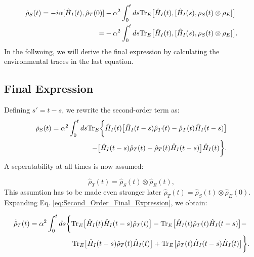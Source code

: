 \begin{align}
	\dot{\rho}_S(t) = -i \alpha [\hat{H}_I(t),\hat{\rho}_T(0)]
	  & - \alpha^2 \int_0^t ds \mathrm{Tr}_E \big[\hat{H}_I(t), [\hat{H}_I(s), \rho_S(t) \otimes \rho_E]\big] \notag \\
	= & - \alpha^2 \int_0^t ds \mathrm{Tr}_E \big[\hat{H}_I(t), [\hat{H}_I(s), \rho_S(t) \otimes \rho_E]\big].
	\label{eq:Partial_Trace_Derivation}
\end{align}
In the follwoing, we will derive the final expression by calculating the environmental traces in the last equation.


\subsection{Final Expression}
\label{subsec:Final_Expression}

Defining $s' = t - s$, we rewrite the second-order term as:
\begin{align}
	\dot{\rho}_S(t)  = \alpha^2 \int_0^t ds \mathrm{Tr}_E \bigg\{
	\hat{H}_I(t) \big[ \hat{H}_I(t-s) \hat{\rho}_T(t) - \hat{\rho}_T(t) \hat{H}_I(t-s) \big] \notag \\
	- \big[ \hat{H}_I(t-s) \hat{\rho}_T(t) - \hat{\rho}_T(t) \hat{H}_I(t-s) \big] \hat{H}_I(t)
	\bigg\}.
	\label{eq:Second_Order_Final_Expression}
\end{align}
A seperatability at all times is now assumed:

\begin{equation}
	\hat{\rho}_T(t) = \hat{\rho}_S(t) \otimes \hat{\rho}_E(t),
	\label{eq:Reduced_Density_Matrix_Assumption}
\end{equation}
This assumtion has to be made even stronger later $\hat{\rho}_T(t) = \hat{\rho}_S(t) \otimes \hat{\rho}_E(0)$.
Expanding Eq. \eqref{eq:Second_Order_Final_Expression}, we obtain:

\begin{align}
	\dot{\hat{\rho}}_T(t) & =  \alpha^2 \int_0^t ds
	\bigg\{
	\mathrm{Tr}_E \big[ \hat{H}_I(t) \hat{H}_I(t-s) \hat{\rho}_T(t) \big] -
	\mathrm{Tr}_E \big[ \hat{H}_I(t) \hat{\rho}_T(t) \hat{H}_I(t-s) \big] - \notag \\
	                      & \qquad \qquad \qquad
	\mathrm{Tr}_E \big[ \hat{H}_I(t-s) \hat{\rho}_T(t) \hat{H}_I(t) \big] +
	\mathrm{Tr}_E \big[ \hat{\rho}_T(t) \hat{H}_I(t-s) \hat{H}_I(t) \big]
	\bigg\}.
	\label{eq:Expanded_Second_Order_Expression}
\end{align}


